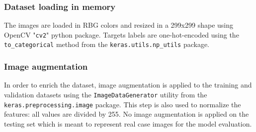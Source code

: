 \subsubsection{Dataset loading in memory}

The images are loaded in RBG colors and resized in a 299x299 shape using OpenCV "\texttt{cv2}" python package. 
Targets labels are one-hot-encoded using the \texttt{to\_categorical} method from the \texttt{keras.utils.np\_utils} package.

%
%
%
%
%

\subsubsection{Image augmentation}
\label{subsubsec:Image_augmentation}

In order to enrich the dataset, image augmentation is applied to the training and validation datasets using the \texttt{ImageDataGenerator} utility from the \texttt{keras.preprocessing.image} package. This step is also used to normalize the features: all values are divided by 255. 
No image augmentation is applied on the testing set which is meant to represent real case images for the model evaluation. 


